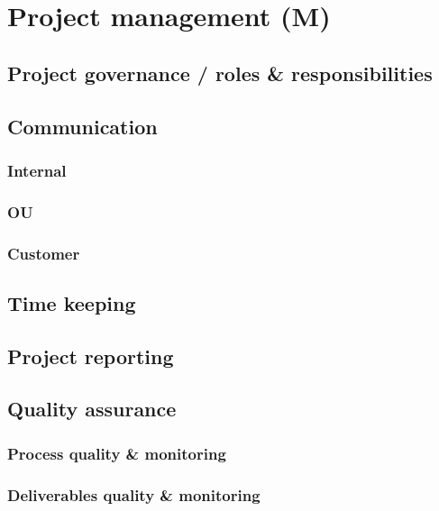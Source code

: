 \section{Project management (M)}
\label{sec:project-management}
\subsection{Project governance / roles \& responsibilities}
\lipsum[1]

\subsection{Communication}
\lipsum[1]

\subsubsection{Internal}
\lipsum[1]

\subsubsection{OU}
\lipsum[1]

\subsubsection{Customer}
\lipsum[1]

\subsection{Time keeping}
\lipsum[1]

\subsection{Project reporting}
\lipsum[1]

\subsection{Quality assurance}
\lipsum[1]

\subsubsection{Process quality \& monitoring}
\lipsum[1]

\subsubsection{Deliverables quality \& monitoring}
\lipsum[1]
